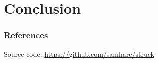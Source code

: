 \documentclass[mathserif,handout]{beamer}
\begin{document}

\section{Conclusion}

\begin{frame}
    \frametitle{References}
    \nocite{*}
    
    

    Source code: \url{https://github.com/samhare/struck}
\end{frame}
\end{document}
